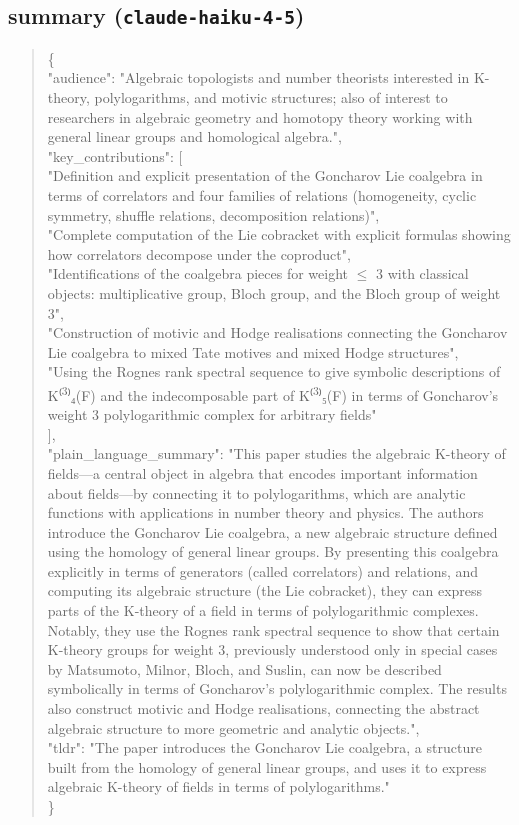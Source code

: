 \documentclass[11pt]{article}
\begin{document}
\subsection*{summary (\texttt{claude-haiku-4-5})}
\begin{quote}\small\ttfamily\raggedright
\{\\
  "audience": "Algebraic topologists and number theorists interested in K-theory, polylogarithms, and motivic structures; also of interest to researchers in algebraic geometry and homotopy theory working with general linear groups and homological algebra.",\\
  "key\_contributions": [\\
    "Definition and explicit presentation of the Goncharov Lie coalgebra in terms of correlators and four families of relations (homogeneity, cyclic symmetry, shuffle relations, decomposition relations)",\\
    "Complete computation of the Lie cobracket with explicit formulas showing how correlators decompose under the coproduct",\\
    "Identifications of the coalgebra pieces for weight \ensuremath{\le} 3 with classical objects: multiplicative group, Bloch group, and the Bloch group of weight 3",\\
    "Construction of motivic and Hodge realisations connecting the Goncharov Lie coalgebra to mixed Tate motives and mixed Hodge structures",\\
    "Using the Rognes rank spectral sequence to give symbolic descriptions of K⁽\textsuperscript{3}⁾₄(F) and the indecomposable part of K⁽\textsuperscript{3}⁾₅(F) in terms of Goncharov's weight 3 polylogarithmic complex for arbitrary fields"\\
  ],\\
  "plain\_language\_summary": "This paper studies the algebraic K-theory of fields---a central object in algebra that encodes important information about fields---by connecting it to polylogarithms, which are analytic functions with applications in number theory and physics. The authors introduce the Goncharov Lie coalgebra, a new algebraic structure defined using the homology of general linear groups. By presenting this coalgebra explicitly in terms of generators (called correlators) and relations, and computing its algebraic structure (the Lie cobracket), they can express parts of the K-theory of a field in terms of polylogarithmic complexes. Notably, they use the Rognes rank spectral sequence to show that certain K-theory groups for weight 3, previously understood only in special cases by Matsumoto, Milnor, Bloch, and Suslin, can now be described symbolically in terms of Goncharov's polylogarithmic complex. The results also construct motivic and Hodge realisations, connecting the abstract algebraic structure to more geometric and analytic objects.",\\
  "tldr": "The paper introduces the Goncharov Lie coalgebra, a structure built from the homology of general linear groups, and uses it to express algebraic K-theory of fields in terms of polylogarithms."\\
\}\\
\end{quote}
\end{document}
